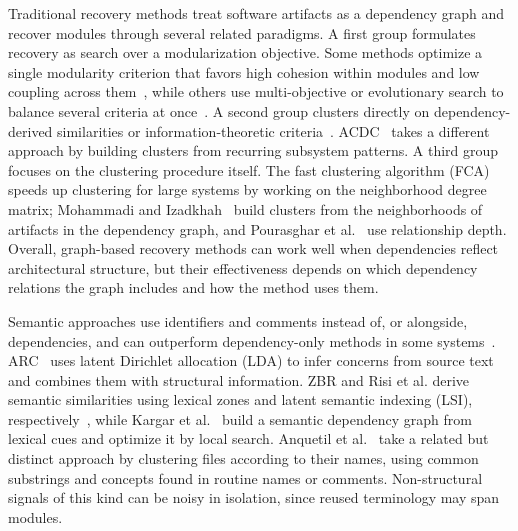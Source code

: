Traditional recovery methods treat software artifacts as a dependency graph and recover modules through several related paradigms. A first group formulates recovery as search over a modularization objective. Some methods optimize a single modularity criterion that favors high cohesion within modules and low coupling across them~\cite{bunch_sahc_nahc,dagc}, while others use multi-objective or evolutionary search to balance several criteria at once~\cite{mca_eca}. A second group clusters directly on dependency-derived similarities or information-theoretic criteria~\cite{cct,hcc_2019,limbo,wca}. ACDC~\cite{acdc} takes a different approach by building clusters from recurring subsystem patterns. A third group focuses on the clustering procedure itself. The fast clustering algorithm (FCA)~\cite{fca} speeds up clustering for large systems by working on the neighborhood degree matrix; Mohammadi and Izadkhah~\cite{neighborhood_tree_2019} build clusters from the neighborhoods of artifacts in the dependency graph, and Pourasghar et al.~\cite{gma_2021} use relationship depth. Overall, graph-based recovery methods can work well when dependencies reflect architectural structure, but their effectiveness depends on which dependency relations the graph includes and how the method uses them.

Semantic approaches use identifiers and comments instead of, or alongside, dependencies, and can outperform dependency-only methods in some systems~\cite{comparative_survey}. ARC~\cite{arc} uses latent Dirichlet allocation (LDA) to infer concerns from source text and combines them with structural information. ZBR and Risi et al. derive semantic similarities using lexical zones and latent semantic indexing (LSI), respectively~\cite{zbr,risi2012fold}, while Kargar et al.~\cite{kargar2017semantic} build a semantic dependency graph from lexical cues and optimize it by local search. Anquetil et al.~\cite{file_clustering} take a related but distinct approach by clustering files according to their names, using common substrings and concepts found in routine names or comments. Non-structural signals of this kind can be noisy in isolation, since reused terminology may span modules.

